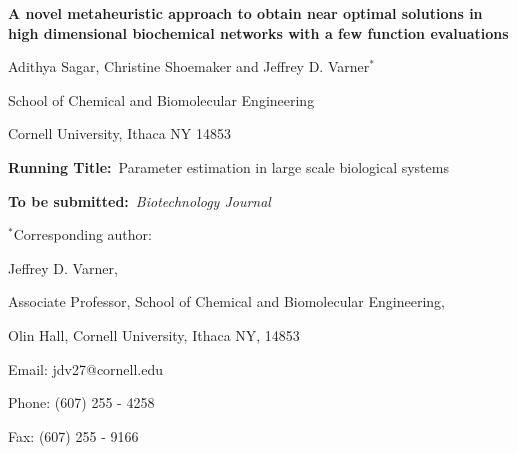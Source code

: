 \documentclass[12pt]{article}
\begin{document}
\begin{titlepage}
{\par\centering\textbf{\Large A novel metaheuristic approach to obtain near optimal solutions in high dimensional biochemical networks with a few function evaluations}}
\vspace{0.05in}
{\par \centering \large{Adithya Sagar, Christine Shoemaker and Jeffrey D. Varner$^{*}$}}
\vspace{0.10in}
{\par \centering \large{School of Chemical and Biomolecular Engineering}}
{\par \centering \large{Cornell University, Ithaca NY 14853}}
\vspace{0.1in}
{\par \centering \textbf{Running Title:}~Parameter estimation in large scale biological systems}
\vspace{0.1in}
{\par \centering \textbf{To be submitted:}~\emph{Biotechnology Journal}}
\vspace{0.5in}
{\par \centering $^{*}$Corresponding author:}
{\par \centering Jeffrey D. Varner,}
{\par \centering Associate Professor, School of Chemical and Biomolecular Engineering,}
{\par {} Olin Hall, Cornell University, Ithaca NY, 14853} 
{\par \centering Email: jdv27@cornell.edu} 
{\par \centering Phone: (607) 255 - 4258}
{\par \centering Fax: (607) 255 - 9166}
\end{titlepage}
\date{}
\thispagestyle{empty}
\pagebreak
\end{document}
